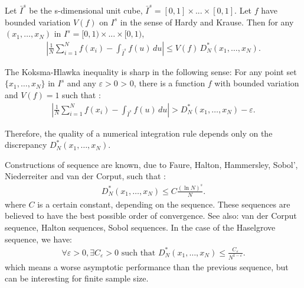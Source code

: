 {    Let $\bar I^s$ be the s-dimensional unit cube, $\bar I^s = [0, 1] \times ... \times [0, 1]$. Let $f$ have bounded variation $V(f)$ on $I^s$ in the sense of Hardy and Krause. Then for any $(x_1, \hdots, x_N)$ in $I^s = [0, 1) \times ... \times [0, 1)$,
        \begin{align*}
          \left| \frac{1}{N} \sum_{i=1}^N f(x_i) - \int_{\bar I^s} f(u)\,du \right| \le V(f)\, D_N^* (x_1,\ldots,x_N).
        \end{align*}

        The Koksma-Hlawka inequality is sharp in the following sense: For any point set $\{x_1, \hdots, x_N\}$ in $I^s$ and any $\varepsilon >0$ > 0, there is a function $f$ with bounded variation and $V(f)=1$ such that :
        \begin{align*}
          \left| \frac{1}{N} \sum_{i=1}^N f(x_i) - \int_{\bar I^s} f(u)\,du \right|>D_{N}^{*}(x_1,\ldots,x_N)-\varepsilon.
        \end{align*}

        Therefore, the quality of a numerical integration rule depends only on the discrepancy $D^*_N(x_1,\hdots,x_N)$.

        Constructions of sequence are known, due to Faure, Halton, Hammersley, Sobol', Niederreiter and van der Corput, such that :
        \begin{align*}
          D_{N}^{*}(x_1,\ldots,x_N)\leq C\frac{(\ln N)^{s}}{N}.
        \end{align*}
        where $C$ is a certain constant, depending on the sequence. These sequences are believed to have the best possible order of convergence. See also: van der Corput sequence, Halton sequences, Sobol sequences. In the case of the Haselgrove sequence, we have:
        \begin{align*}
          \forall \varepsilon>0,\exists C_{\varepsilon}>0\mbox{ such that }D_{N}^{*}(x_1,\ldots,x_N)\leq \frac{C_{\varepsilon}}{N^{1-\varepsilon}}.
        \end{align*}
        which means a worse asymptotic performance than the previous sequence, but can be interesting for finite sample size.\\

}
